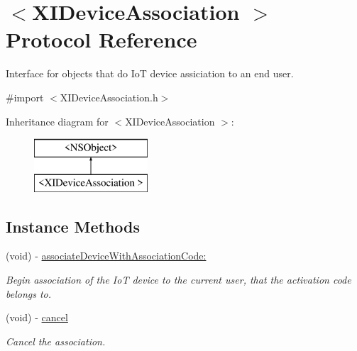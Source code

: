 \hypertarget{protocol_x_i_device_association_01-p}{}\section{$<$X\+I\+Device\+Association $>$ Protocol Reference}
\label{protocol_x_i_device_association_01-p}


Interface for objects that do IoT device assiciation to an end user.  




{\ttfamily \#import $<$X\+I\+Device\+Association.\+h$>$}

Inheritance diagram for $<$X\+I\+Device\+Association $>$\+:\begin{figure}[H]
\begin{center}
\leavevmode
\includegraphics[height=2.000000cm]{protocol_x_i_device_association_01-p}
\end{center}
\end{figure}
\subsection*{Instance Methods}
\begin{DoxyCompactItemize}
\item 
(void) -\/ \hyperlink{protocol_x_i_device_association_01-p_a51b895b55ddb9ba961d35c0bac09ef3b}{associate\+Device\+With\+Association\+Code\+:}
\begin{DoxyCompactList}\small\item\em Begin association of the IoT device to the current user, that the activation code belongs to. \end{DoxyCompactList}\item 
(void) -\/ \hyperlink{protocol_x_i_device_association_01-p_a3e83f44defee4be07893de3e4029be8a}{cancel}
\begin{DoxyCompactList}\small\item\em Cancel the association. \end{DoxyCompactList}\end{DoxyCompactItemize}
